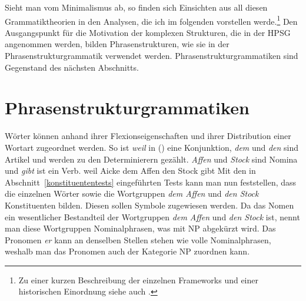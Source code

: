 \noindent
Sieht man vom Minimalismus ab, so finden sich Einsichten aus all diesen Grammatiktheorien
in den Analysen, die ich im folgenden vorstellen werde.\footnote{
  Zu einer kurzen Beschreibung der einzelnen Frameworks und einer historischen Einordnung
  siehe auch .%
}
Den Ausgangspunkt für die Motivation
der komplexen Strukturen, die in der HPSG angenommen werden, bilden Phrasenstrukturen, wie sie
in der Phrasenstrukturgrammatik verwendet werden. Phrasenstrukturgrammatiken sind Gegenstand des
nächsten Abschnitts.


\section{Phrasenstrukturgrammatiken}
\label{sec-psg}

Wörter können anhand ihrer Flexionseigenschaften und ihrer Distribution einer Wortart zugeordnet werden.
So ist \emph{weil} in () eine Konjunktion, \emph{dem} und \emph {den}
sind Artikel und werden zu den Determinierern gezählt. \emph{Affen} und \emph{Stock} sind Nomina und \emph{gibt}
ist ein Verb.
\ea
\label{bsp-weil-Aicke-dem-Affen-den-Stock-gibt}
weil Aicke dem Affen den Stock gibt
\z
Mit den in Abschnitt~\ref{konstituententests} eingeführten Tests kann man nun feststellen, dass
die einzelnen Wörter sowie die Wortgruppen \emph{dem Affen} und \emph{den Stock} Konstituenten bilden.
Diesen sollen Symbole zugewiesen werden. Da das Nomen ein wesentlicher Bestandteil der Wortgruppen
\emph{dem Affen} und \emph{den Stock} ist, nennt man diese Wortgruppen Nominalphrasen, was mit NP abgekürzt wird. Das Pronomen \emph{er}
kann an denselben Stellen stehen wie volle Nominalphrasen, weshalb man das Pronomen auch der
Kategorie NP zuordnen kann.

